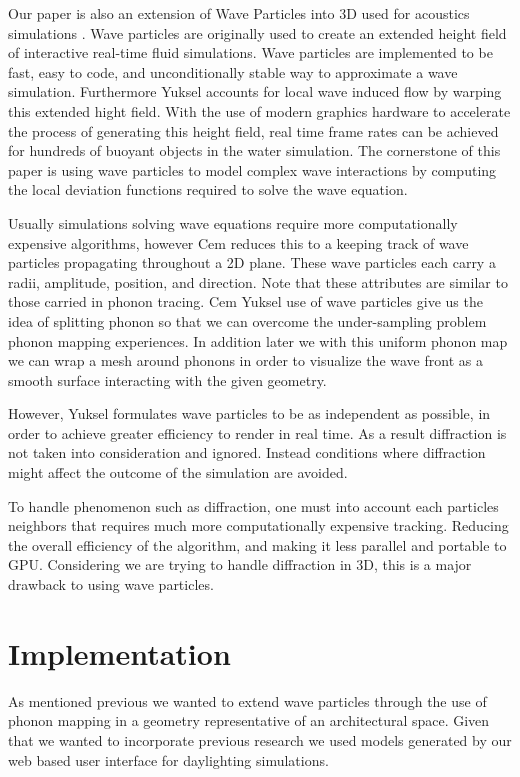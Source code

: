\documentclass{thesis}
\begin{document}
Our paper is also an extension of Wave Particles into 3D used for acoustics simulations \cite{Yuksel2010}.  Wave particles are originally used to create an extended height field of interactive real-time fluid simulations.  Wave particles are implemented to be fast, easy to code, and unconditionally stable way to approximate a wave simulation. Furthermore Yuksel accounts for local wave induced flow by warping this extended hight field. With the use of modern graphics hardware to accelerate the process of generating this height field, real time frame rates can be achieved for hundreds of buoyant objects in the water simulation.  The cornerstone of this paper is using wave particles to model complex wave interactions by computing the local deviation functions required to solve the wave equation. 

Usually simulations solving wave equations require more computationally expensive algorithms, however Cem reduces this to a keeping track of wave particles propagating throughout a 2D plane. These wave particles each carry a radii, amplitude, position, and direction. Note that these attributes are similar to those carried in phonon tracing.  Cem Yuksel use of wave particles give us the idea of splitting phonon so that we can overcome the under-sampling problem phonon mapping experiences. In addition later we with this uniform phonon map we can wrap a mesh around phonons in order to visualize the wave front as a smooth surface interacting with the given geometry. 

However, Yuksel formulates wave particles to be as independent as possible, in order to achieve greater efficiency to render in real time. As a result diffraction is not taken into consideration and ignored. Instead conditions where diffraction might affect the outcome of the simulation are avoided.

To handle phenomenon such as diffraction, one must into account each particles neighbors that requires much more computationally expensive tracking. Reducing the overall efficiency of the algorithm, and making it less parallel and portable to GPU. Considering we are trying to handle diffraction in 3D, this is a major drawback to using wave particles. 


\chapter{Implementation}
As mentioned previous we wanted to extend wave particles through the use of phonon mapping in a geometry representative of an architectural space. Given that we wanted to incorporate previous research we used models generated by our web based user interface for daylighting simulations. 
\end{document}
